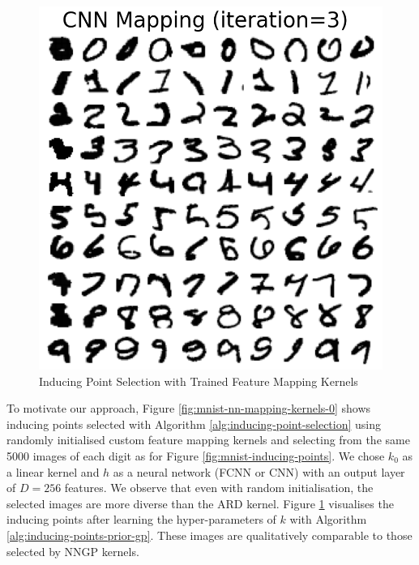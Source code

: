 \documentclass{article}
\numberwithin{equation}{section}
\begin{document}
\begin{figure}[h!]
\begin{minipage}{.25\textwidth}
  \includegraphics[width=\linewidth, trim={0 0 0 1.5cm},clip]{thesis-report/figures/custom_mapping/cnn/iteration_3.png}
\end{minipage}%
\caption{Inducing Point Selection with Trained Feature Mapping Kernels}\label{fig:mnist-nn-mapping-kernels-3}
\end{figure}

To motivate our approach, Figure \ref{fig:mnist-nn-mapping-kernels-0} shows inducing points selected with Algorithm \ref{alg:inducing-point-selection} using randomly initialised custom feature mapping kernels and selecting from the same 5000 images of each digit as for Figure \ref{fig:mnist-inducing-points}. 
We chose $k_0$ as a linear kernel and $h$ as a neural network (FCNN or CNN) with an output layer of $D=256$ features. 
We observe that even with random initialisation, the selected images are more diverse than the ARD kernel.
Figure \ref{fig:mnist-nn-mapping-kernels-3} visualises the inducing points after learning the hyper-parameters of $k$ with Algorithm \ref{alg:inducing-points-prior-gp}.
These images are qualitatively comparable to those selected by NNGP kernels.
\end{document}
